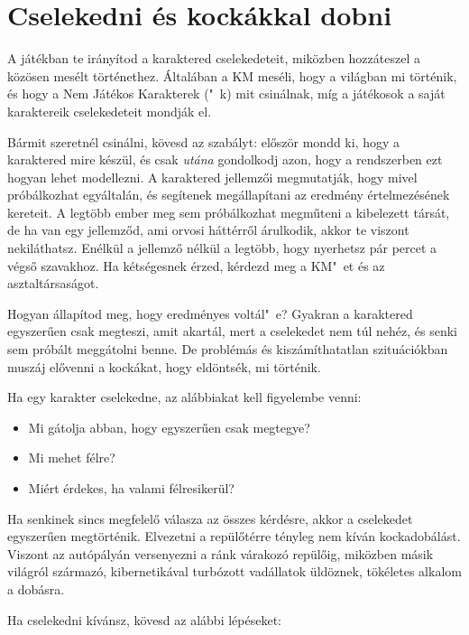 \chapter{Cselekedni és kockákkal dobni}

A  játékban te irányítod a karaktered cselekedeteit, miközben hozzáteszel a közösen mesélt történethez. Általában a KM meséli, hogy a világban mi történik, és hogy a Nem Játékos Karakterek ("~k) mit csinálnak, míg a játékosok a saját karaktereik cselekedeteit mondják el.

Bármit szeretnél csinálni, kövesd az  szabályt: először mondd ki, hogy a karaktered mire készül, és csak \emph{utána} gondolkodj azon, hogy a rendszerben ezt hogyan lehet modellezni. A karaktered jellemzői megmutatják, hogy mivel próbálkozhat egyáltalán, és segítenek megállapítani az eredmény értelmezésének kereteit. A legtöbb ember meg sem próbálkozhat megműteni a kibelezett társát, de ha van egy jellemződ, ami orvosi háttérről árulkodik, akkor te viszont nekiláthatsz. Enélkül a jellemző nélkül a legtöbb, hogy nyerhetsz pár percet a végső szavakhoz. Ha kétségesnek érzed, kérdezd meg a KM"~et és az asztaltársaságot.

Hogyan állapítod meg, hogy eredményes voltál"~e? Gyakran a karaktered egyszerűen csak megteszi, amit akartál, mert a cselekedet nem túl nehéz, és senki sem próbált meggátolni benne. De problémás és kiszámíthatatlan szituációkban muszáj elővenni a kockákat, hogy eldöntsék, mi történik.

Ha egy karakter cselekedne, az alábbiakat kell figyelembe venni:

\begin{itemize}
    \item Mi gátolja abban, hogy egyszerűen csak megtegye?
    \item Mi mehet félre?
    \item Miért érdekes, ha valami félresikerül?
\end{itemize}

Ha senkinek sincs megfelelő válasza az összes kérdésre, akkor a cselekedet egyszerűen megtörténik. Elvezetni a repülőtérre tényleg nem kíván kockadobálást. Viszont az autópályán versenyezni a ránk várakozó repülőig, miközben másik világról származó, kibernetikával turbózott vadállatok üldöznek, tökéletes alkalom a dobásra.

Ha cselekedni kívánsz, kövesd az alábbi lépéseket:

